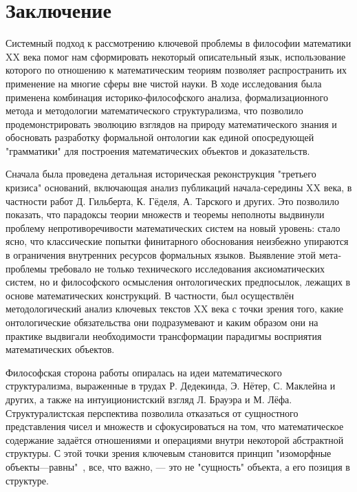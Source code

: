 \documentclass[14pt]{extarticle}
\begin{document}
	\section*{Заключение}

	Системный подход к рассмотрению ключевой проблемы в философии математики XX века помог нам сформировать некоторый описательный язык, использование которого по отношению к математическим теориям позволяет распространить их применение на многие сферы вне чистой науки. В ходе исследования была применена комбинация историко‐философского анализа, формализационного метода и методологии математического структурализма, что позволило продемонстрировать эволюцию взглядов на природу математического знания и обосновать разработку формальной онтологии как единой опосредующей "грамматики" для построения математических объектов и доказательств. 
	
	Сначала была проведена детальная историческая реконструкция "третьего кризиса" оснований, включающая анализ публикаций начала‐середины XX века, в частности работ Д. Гильберта, К. Гёделя, А. Тарского и других. Это позволило показать, что парадоксы теории множеств и теоремы неполноты выдвинули проблему непротиворечивости математических систем на новый уровень: стало ясно, что классические попытки финитарного обоснования неизбежно упираются в ограничения внутренних ресурсов формальных языков. Выявление этой мета‐проблемы требовало не только технического исследования аксиоматических систем, но и философского осмысления онтологических предпосылок, лежащих в основе математических конструкций. В частности, был осуществлён методологический анализ ключевых текстов XX века с точки зрения того, какие онтологические обязательства они подразумевают и каким образом они на практике выдвигали необходимости трансформации парадигмы восприятия математических объектов.
	
	Философская сторона работы опиралась на идеи математического структурализма, выраженные в трудах Р. Дедекинда, Э. Нётер, С. Маклейна и других, а также на интуиционистский взгляд Л. Брауэра и М. Лёфа. Структуралистская перспектива позволила отказаться от сущностного представления чисел и множеств и сфокусироваться на том, что математическое содержание задаётся отношениями и операциями внутри некоторой абстрактной структуры. С этой точки зрения ключевым становится принцип "изоморфные объекты—равны"\  , все, что важно, — это не "сущность" объекта, а его позиция в структуре. 
	
\end{document}
